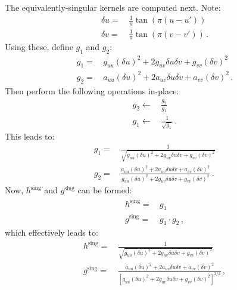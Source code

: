 The equivalently-singular kernels are computed next.
Note:
\begin{align}
 \delta u =&\, \frac{1}{\pi} \tan(\pi (u - u')) \\
 \delta v =&\, \frac{1}{\pi} \tan(\pi (v - v')) \, .
\end{align}
Using these, define $g_1$ and $g_2$:
\begin{align}
 g_1 =&\, g_{uu} (\delta u)^2 + 2 g_{uv} \delta u \delta v + g_{vv} (\delta v)^2 \\
 g_2 =&\, a_{uu} (\delta u)^2 + 2 a_{uv} \delta u \delta v + a_{vv} (\delta v)^2 \, .
\end{align}
Then perform the following operations in-place:
\begin{align}
 g_2 \leftarrow&\, \frac{g_2}{g_1} \\
 g_1 \leftarrow&\, \frac{1}{\sqrt{g_1}} \, .
\end{align}
This leads to:
\begin{align}
 g_1 =&\, \frac{1}
               {\sqrt{ g_{uu} (\delta u)^2 + 2 g_{uv} \delta u \delta v + g_{vv} (\delta v)^2 }} \\
 g_2 =&\, \frac{       a_{uu} (\delta u)^2 + 2 a_{uv} \delta u \delta v + a_{vv} (\delta v)^2  }
               {       g_{uu} (\delta u)^2 + 2 g_{uv} \delta u \delta v + g_{vv} (\delta v)^2  } \, .
\end{align}
Now, $h^\textrm{sing}$ and $g^\textrm{sing}$ can be formed:
\begin{align}
 h^\textrm{sing} =&\, g_1 \\
 g^\textrm{sing} =&\, g_1 \cdot g_2 \, ,
\end{align}
which effectively leads to:
\begin{align}
 h^\textrm{sing} =&\, \frac{1}
                           {\sqrt{ g_{uu} (\delta u)^2 + 2 g_{uv} \delta u \delta v + g_{vv} (\delta v)^2 }}  \\
 g^\textrm{sing} =&\, \frac{       a_{uu} (\delta u)^2 + 2 a_{uv} \delta u \delta v + a_{vv} (\delta v)^2               }
                           { \left[g_{uu} (\delta u)^2 + 2 g_{uv} \delta u \delta v + g_{vv} (\delta v)^2 \right]^{3/2} }  \, ,
\end{align}

\FloatBarrier
